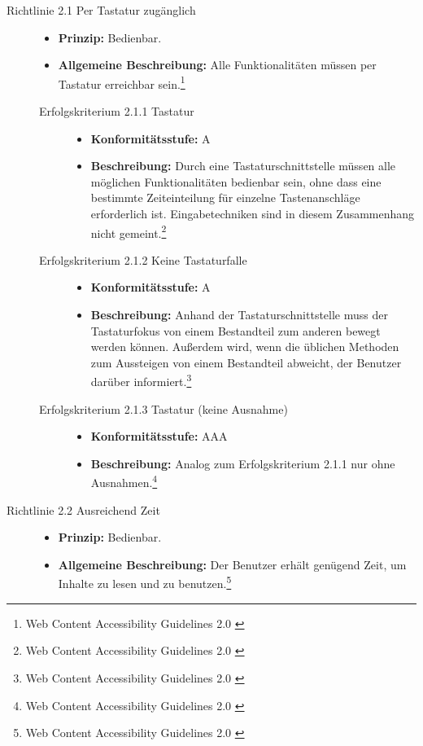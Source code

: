 \begin{description}
	\item[Richtlinie 2.1 Per Tastatur zugänglich]\hfill
	\begin{itemize}
		\item \textbf{Prinzip:} Bedienbar.
		\item \textbf{Allgemeine Beschreibung:} Alle Funktionalitäten müssen per Tastatur erreichbar sein.\footnote{Web Content Accessibility Guidelines 2.0 \cite{WCAG2.0}}
	\end{itemize}
	
	\begin{description}
		\item[Erfolgskriterium 2.1.1 Tastatur]\hfill
		\begin{itemize}
			\item \textbf{Konformitätsstufe:} A
			\item \textbf{Beschreibung:} Durch eine Tastaturschnittstelle müssen alle möglichen Funktionalitäten bedienbar sein, ohne dass eine bestimmte 
			Zeiteinteilung für einzelne Tastenanschläge erforderlich ist. Eingabetechniken sind in diesem Zusammenhang nicht 
			gemeint.\footnote{Web Content Accessibility Guidelines 2.0 \cite{WCAG2.0}}
		\end{itemize}
		
		\item[Erfolgskriterium 2.1.2 Keine Tastaturfalle]\hfill
		\begin{itemize}
			\item \textbf{Konformitätsstufe:} A
			\item \textbf{Beschreibung:} Anhand der Tastaturschnittstelle muss der Tastaturfokus von einem Bestandteil zum anderen bewegt werden können. Außerdem wird, wenn 
			die üblichen Methoden zum Aussteigen von einem Bestandteil abweicht, der Benutzer darüber informiert.\footnote{Web Content Accessibility Guidelines 2.0 \cite{WCAG2.0}}
		\end{itemize}
		
		\item[Erfolgskriterium 2.1.3 Tastatur (keine Ausnahme)]\hfill
		\begin{itemize}
			\item \textbf{Konformitätsstufe:} AAA
			\item \textbf{Beschreibung:} Analog zum Erfolgskriterium 2.1.1 nur ohne Ausnahmen.\footnote{Web Content Accessibility Guidelines 2.0 \cite{WCAG2.0}}
		\end{itemize}
	\end{description}
	
	\item[Richtlinie 2.2 Ausreichend Zeit]\hfill
	\begin{itemize}
		\item \textbf{Prinzip:} Bedienbar.
		\item \textbf{Allgemeine Beschreibung:} Der Benutzer erhält genügend Zeit, um Inhalte zu lesen und zu benutzen.\footnote{Web Content Accessibility Guidelines 2.0 \cite{WCAG2.0}}
	\end{itemize}
	

\end{description}
